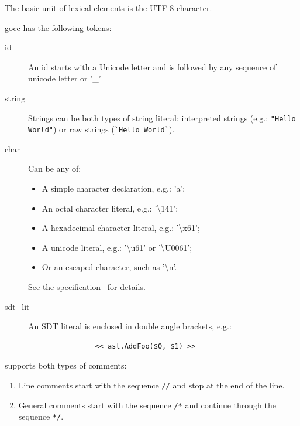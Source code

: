 \documentclass[12pt]{article}
\begin{document}
	The basic unit of lexical elements is the UTF-8 character.

	gocc has the following tokens:

	\begin{description}
		\item[id] An id starts with a Unicode letter and is followed by any sequence of unicode letter or '\_'

		\item[string] Strings can be both types of \Go string literal: interpreted strings (e.g.: \verb|"Hello World"|) or raw strings (\verb|`Hello World`|).

		\item[char] Can be any of:

			\begin{itemize}
				\item A simple character declaration, e.g.: 'a';
				\item An octal character literal, e.g.: '\textbackslash 141';
				\item A hexadecimal character literal, e.g.: '\textbackslash x61';
				\item A unicode literal, e.g.: '\textbackslash u61' or '\textbackslash U0061';
				\item Or an escaped character, such as '\textbackslash n'.
			\end{itemize}

			See the \Go specification~\cite{gospec} for details.

		\item[sdt\_lit] An SDT literal is enclosed in double angle brackets, e.g.: 
			\begin{verbatim}
				<< ast.AddFoo($0, $1) >>
			\end{verbatim}
	\end{description}

	\gocc supports both types of \Go comments:
	\begin{enumerate}
		\item Line comments start with the sequence \verb|//| and stop at the end of the line.
		\item General comments start with the sequence \verb|/*| and continue through the sequence \verb|*/|.
	\end{enumerate}
		
\end{document}
